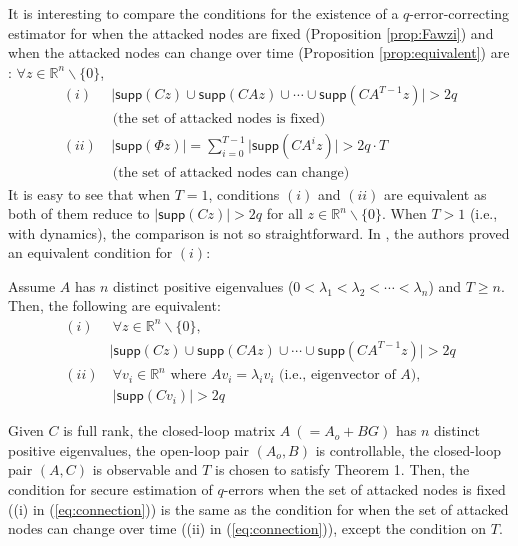 \documentclass[../../thesis.tex]{subfiles}
\begin{document}
It is interesting to compare the conditions for the existence of a $q$-error-correcting estimator for when the attacked nodes are fixed (Proposition \ref{prop:Fawzi}) and when the attacked nodes can change over time (Proposition \ref{prop:equivalent}) are :
$\forall z \in \mathbb{R}^n\backslash \{0 \}$,
\begin{equation}
\begin{aligned}
(i) &~  \lvert \textsf{supp}(Cz) \cup \textsf{supp}(CAz) \cup \cdots \cup \textsf{supp}(CA^{T-1} z) \rvert > 2q  \\& \text{ (the set of attacked nodes is fixed)}\\
(ii) & ~ \lvert \textsf{supp} (\Phi z) \rvert 
     =  \sum_{i=0}^{T-1} \lvert \textsf{supp} (C A^i z) \rvert > 2 q \cdot T \\& \text{ (the set of attacked nodes can change)} 
	\label{eq:connection}
\end{aligned}
\end{equation}
It is easy to see that when $T=1$, conditions $(i)$ and $(ii)$ are equivalent as both of them reduce to $\lvert \textsf{supp} (Cz) \rvert > 2q$ for all $z \in \mathbb{R}^n\backslash \{0 \}$.
When $T>1$ (i.e., with dynamics), the comparison is not so straightforward. In \cite{Fawzi2014}, the authors proved an equivalent condition for $(i)$:

\begin{lem} \label{lem:distinct}
Assume $A$ has $n$ distinct positive eigenvalues ($0<\lambda_1 < \lambda_2 <\cdots < \lambda_n$) and $T \geq n$. Then, the following are equivalent:
\begin{equation}
\begin{aligned}
 (i) &~ \forall z \in \mathbb{R}^n \backslash \{0\},  \\& \lvert \textsf{supp}(Cz) \cup \textsf{supp}(CAz) \cup \cdots \cup \textsf{supp}(CA^{T-1} z) \rvert > 2q  \\
 (ii)  &~\forall v_i \in \mathbb{R}^n \text{ where }   Av_i = \lambda_i v_i \text{ (i.e., eigenvector of $A$)},\\& ~ \lvert \textsf{supp}(Cv_i) \rvert > 2q \nonumber
\label{eq:condition}
\end{aligned}
\end{equation}
\end{lem}

\begin{proposition}\label{prop:equivalent2}
Given $C$ is full rank, the closed-loop matrix $A~(=A_o+BG)$ has $n$ distinct positive eigenvalues, the open-loop pair $(A_o,B)$ is controllable, the closed-loop pair $(A,C)$ is observable and $T$ is chosen to satisfy Theorem 1. Then, the condition for secure estimation of $q$-errors when the set of attacked nodes is fixed ((i) in (\ref{eq:connection})) is the same as the condition for when the set of attacked nodes can change over time ((ii) in (\ref{eq:connection})), except the condition on $T$.
\end{proposition}
\end{document}
